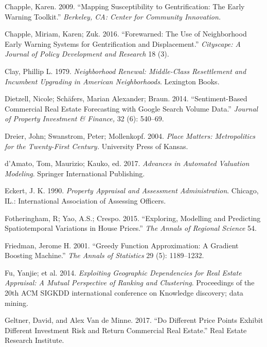 \documentclass[]{article}
\begin{document}
\hypertarget{ref-Chapple2009}{}
Chapple, Karen. 2009. ``Mapping Susceptibility to Gentrification: The
Early Warning Toolkit.'' \emph{Berkeley, CA: Center for Community
Innovation.}

\hypertarget{ref-Chapple2016}{}
Chapple, Miriam, Karen; Zuk. 2016. ``Forewarned: The Use of Neighborhood
Early Warning Systems for Gentrification and Displacement.''
\emph{Cityscape: A Journal of Policy Development and Research} 18 (3).

\hypertarget{ref-Clay1979}{}
Clay, Phillip L. 1979. \emph{Neighborhood Renewal: Middle-Class
Resettlement and Incumbent Upgrading in American Neighborhoods}.
Lexington Books.

\hypertarget{ref-Dietzell2014}{}
Dietzell, Nicole; Schäfers, Marian Alexander; Braun. 2014.
``Sentiment-Based Commercial Real Estate Forecasting with Google Search
Volume Data.'' \emph{Journal of Property Investment \& Finance,} 32 (6):
540--69.

\hypertarget{ref-Dreier2004}{}
Dreier, John; Swanstrom, Peter; Mollenkopf. 2004. \emph{Place Matters:
Metropolitics for the Twenty-First Century.} University Press of Kansas.

\hypertarget{ref-Springer2017}{}
d'Amato, Tom, Maurizio; Kauko, ed. 2017. \emph{Advances in Automated
Valuation Modeling}. Springer International Publishing.

\hypertarget{ref-Eckert1990}{}
Eckert, J. K. 1990. \emph{Property Appraisal and Assessment
Administration}. Chicago, IL.: International Association of Assessing
Officers.

\hypertarget{ref-Fotheringham2015}{}
Fotheringham, R; Yao, A.S.; Crespo. 2015. ``Exploring, Modelling and
Predicting Spatiotemporal Variations in House Prices.'' \emph{The Annals
of Regional Science} 54.

\hypertarget{ref-Friedman2001}{}
Friedman, Jerome H. 2001. ``Greedy Function Approximation: A Gradient
Boosting Machine.'' \emph{The Annals of Statistics} 29 (5): 1189--1232.

\hypertarget{ref-Fu2014}{}
Fu, Yanjie; et al. 2014. \emph{Exploiting Geographic Dependencies for
Real Estate Appraisal: A Mutual Perspective of Ranking and Clustering}.
Proceedings of the 20th ACM SIGKDD international conference on Knowledge
discovery; data mining.

\hypertarget{ref-Geltner2017}{}
Geltner, David, and Alex Van de Minne. 2017. ``Do Different Price Points
Exhibit Different Investment Risk and Return Commercial Real Estate.''
Real Estate Research Institute.
\end{document}
